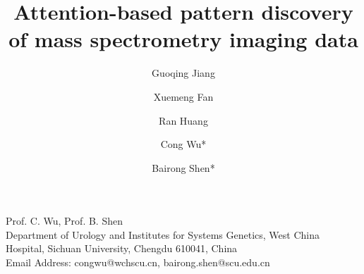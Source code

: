 \documentclass{WileyMSP-template}
\begin{document}
 
   
  
\pagestyle{fancy}


\title{Attention-based pattern discovery of mass spectrometry imaging data }
\maketitle

 


\author{Guoqing Jiang}
\author{Xuemeng Fan}
\author{Ran Huang}
\author{Cong Wu*}   
\author{Bairong Shen*}










\begin{affiliations}
Prof. C. Wu, Prof. B. Shen\\
Department of Urology and Institutes
for Systems Genetics, West China Hospital, Sichuan
University, Chengdu 610041, China\\
Email Address: congwu@wchscu.cn, bairong.shen@scu.edu.cn
\end{affiliations}



\end{document}
